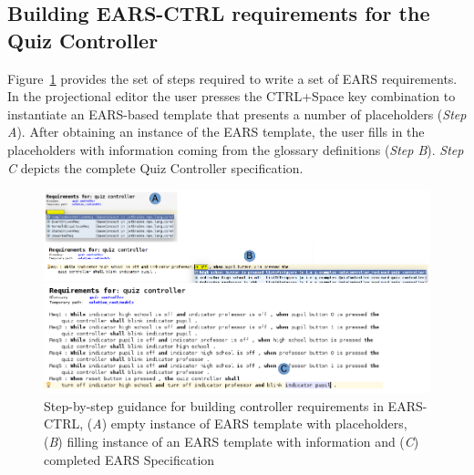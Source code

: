 \subsection{Building \textsf{EARS-CTRL} requirements for the Quiz Controller}
\vspace{-.2cm}
Figure~\ref{fig:EARS_req} provides the set of steps required to write a set of
EARS requirements. In the projectional editor the user presses the CTRL+Space
key combination to instantiate an EARS-based template that presents a number of
placeholders (\emph{Step A}). After obtaining
an instance of the EARS template, the user fills in the placeholders with
information coming from the glossary definitions (\emph{Step B}). \emph{Step C}
depicts the complete Quiz Controller specification.
\begin{figure}[!h]
\centering
\includegraphics[width=1.2\textwidth]{./images/Req_Spec_Steps.png}
\caption{Step-by-step guidance for building controller requirements in
\textsf{EARS-CTRL}, (\emph{A}) empty instance of EARS template with placeholders, (\emph{B}) filling instance
of an EARS template with information and (\emph{C}) completed EARS Specification}
\label{fig:EARS_req}
\vspace{-.8cm}
\end{figure}
\vspace{-.2cm}
